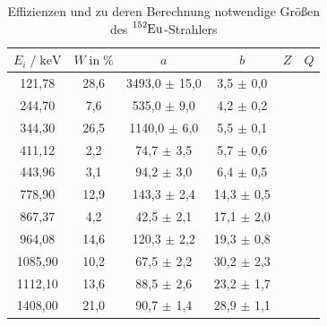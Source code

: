 \begin{table}
  \centering
  \caption{Effizienzen und zu deren Berechnung notwendige Größen des $\ce{^{152}Eu}$-Strahlers}
  \label{tab:mess2}
  \begin{tabular}{c c c c c c}
  \toprule
  $E_i \;/\; \si{\kilo\eV}$ & $W \;\text{in}\; \si{\percent}$ & $a$ & $b$ & $Z$ & $Q$ \\
  \midrule
        121,78 & 28,6 & 3493,0 $\pm$ 15,0 &  3,5 $\pm$ 0,0 & & \\
        244,70 &  7,6 &  535,0 $\pm$  9,0 &  4,2 $\pm$ 0,2 & & \\
        344,30 & 26,5 & 1140,0 $\pm$  6,0 &  5,5 $\pm$ 0,1 & & \\
        411,12 &  2,2 &   74,7 $\pm$  3,5 &  5,7 $\pm$ 0,6 & & \\
        443,96 &  3,1 &   94,2 $\pm$  3,0 &  6,4 $\pm$ 0,5 & & \\
        778,90 & 12,9 &  143,3 $\pm$  2,4 & 14,3 $\pm$ 0,5 & & \\
        867,37 &  4,2 &   42,5 $\pm$  2,1 & 17,1 $\pm$ 2,0 & & \\
        964,08 & 14,6 &  120,3 $\pm$  2,2 & 19,3 $\pm$ 0,8 & & \\
       1085,90 & 10,2 &   67,5 $\pm$  2,2 & 30,2 $\pm$ 2,3 & & \\
       1112,10 & 13,6 &   88,5 $\pm$  2,6 & 23,2 $\pm$ 1,7 & & \\
       1408,00 & 21,0 &   90,7 $\pm$  1,4 & 28,9 $\pm$ 1,1 & & \\
  \bottomrule
  \end{tabular}
  \end{table}




